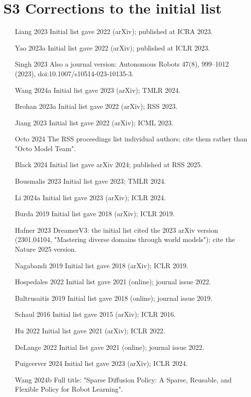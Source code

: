 \documentclass[10pt,a4paper]{article}
\begin{document}
\section*{S3 Corrections to the initial list}
\begin{itemize}\setlength{\itemsep}{0pt}
\item [Liang 2023] Initial list gave 2022 (arXiv); published at ICRA 2023.
\item [Yao 2023a] Initial list gave 2022 (arXiv); published at ICLR 2023.
\item [Singh 2023] Also a journal version: Autonomous Robots 47(8), 999--1012 (2023), doi:10.1007/s10514-023-10135-3.
\item [Wang 2024a] Initial list gave 2023 (arXiv); TMLR 2024.
\item [Brohan 2023a] Initial list gave 2022 (arXiv); RSS 2023.
\item [Jiang 2023] Initial list gave 2022 (arXiv); ICML 2023.
\item [Octo 2024] The RSS proceedings list individual authors; cite them rather than "Octo Model Team".
\item [Black 2024] Initial list gave arXiv 2024; published at RSS 2025.
\item [Bousmalis 2023] Initial list gave 2023; TMLR 2024.
\item [Li 2024a] Initial list gave 2023 (arXiv); ICLR 2024.
\item [Burda 2019] Initial list gave 2018 (arXiv); ICLR 2019.
\item [Hafner 2023] DreamerV3: the initial list cited the 2023 arXiv version (2301.04104, "Mastering diverse domains through world models"); cite the Nature 2025 version.
\item [Nagabandi 2019] Initial list gave 2018 (arXiv); ICLR 2019.
\item [Hospedales 2022] Initial list gave 2021 (online); journal issue 2022.
\item [Baltrusaitis 2019] Initial list gave 2018 (online); journal issue 2019.
\item [Schaul 2016] Initial list gave 2015 (arXiv); ICLR 2016.
\item [Hu 2022] Initial list gave 2021 (arXiv); ICLR 2022.
\item [DeLange 2022] Initial list gave 2021 (online); journal issue 2022.
\item [Puigcerver 2024] Initial list gave 2023 (arXiv); ICLR 2024.
\item [Wang 2024b] Full title: "Sparse Diffusion Policy: A Sparse, Reusable, and Flexible Policy for Robot Learning".

\end{itemize}
\end{document}
